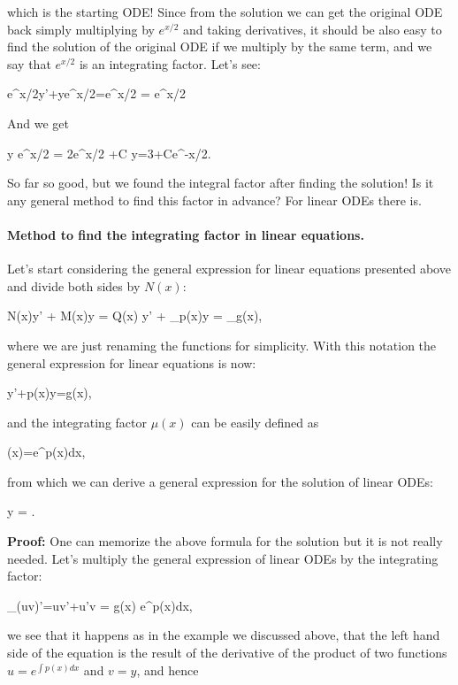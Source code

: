 which is the starting ODE! Since from the solution we can get the original ODE back simply multiplying
by $e^{x/2}$ and taking derivatives, it should be also easy to find the solution of the original ODE if
we multiply by the same term, and we say that $e^{x/2}$ is an integrating factor. Let's see:

\bnn
	e^{x/2}y'+ye^{x/2}=e^{x/2} \quad \rightarrow \int {} = \int  {}e^{x/2}
\enn

And we get

\bnn
	y e^{x/2} =  2e^{x/2} +C  \quad \rightarrow y=3+Ce^{-x/2}.
\enn

So far so good, but we found the integral factor after finding the solution! Is it any general method to find this factor in advance? For linear ODEs there is.

\paragraph{Method to find the integrating factor in linear equations.} Let's start considering the general expression for linear equations presented above and divide both sides by $N(x)$:

\bnn N(x)y' + M(x)y = Q(x) \quad \rightarrow y' + _{p(x)}y = _{g(x)}, \enn

where we are just renaming the functions for simplicity. With this notation the general expression for linear equations is now:

\bnn
  y'+p(x)y=g(x),
\enn

and the integrating factor $\mu(x)$ can be easily defined as

\bnn
  \mu(x)=e^{\int p(x)dx},
\enn

from which we can derive a general expression for the solution of linear ODEs:

\bnn
	y = .
\enn

{\bf Proof:} One can memorize the above formula for the solution but it is not really needed. Let's multiply
the general expression of linear ODEs by the integrating factor:

\bnn
    _{\small{(uv)'=uv'+u'v}} = g(x) e^{\int p(x)dx},
\enn

we see that it happens as in the example we discussed above, that the left hand side of the equation is the result of the derivative of the product of two functions $u=e^{\int p(x)dx}$ and $v=y$, and hence

